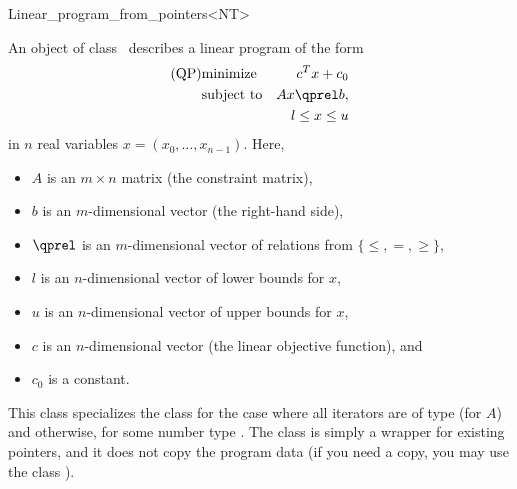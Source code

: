 \begin{ccRefClass}{Linear_program_from_pointers<NT>}


\ccDefinition
An object of class \ccRefName\ describes a linear program of the form
\begin{eqnarray*}
\mbox{(QP)}& \mbox{minimize} & c^{T}x+c_0 \\
&\mbox{subject to}   & Ax\qprel b, \\
&                    & l \leq x \leq u
\end{eqnarray*}
in $n$ real variables $x=(x_0,\ldots,x_{n-1})$.
Here, 
\begin{itemize}
\item $A$ is an $m\times n$ matrix (the constraint matrix), 
\item $b$ is an $m$-dimensional vector (the right-hand side),
\item $\qprel$ is an $m$-dimensional vector of relations 
from $\{\leq, =, \geq\}$, 
\item $l$ is an $n$-dimensional vector of lower
bounds for $x$,
\item $u$ is an $n$-dimensional vector of upper bounds for
$x$, 
\item $c$ is an $n$-dimensional vector (the linear objective
  function), and 
\item $c_0$ is a constant.
\end{itemize}

This class specializes the class
 for the case where all iterators are of type  (for
$A$) and  otherwise, for some number type .
The class is simply a wrapper for 
existing pointers, and it does not copy the program data (if you need
a copy, you may use the class ).

\ccIsModel
{}

\ccSeeAlso
{}\\

\end{ccRefClass}
